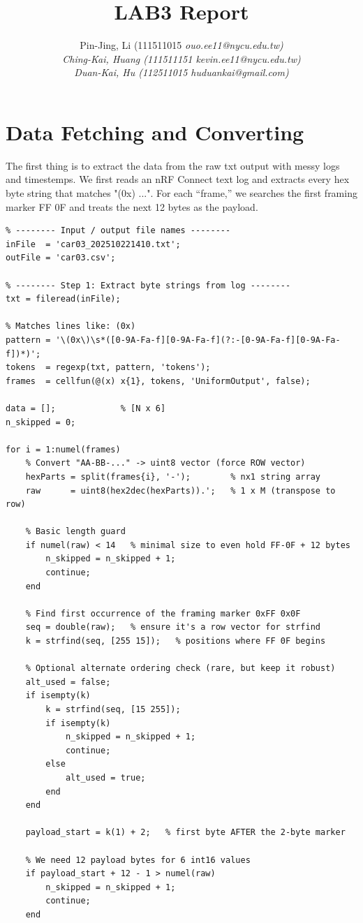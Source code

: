 \documentclass[10pt]{article}
\title{\vspace{-0.2em} \huge LAB3 Report}
\author{Pin-Jing, Li (111511015 \it{ouo.ee11@nycu.edu.tw})\\ 
Ching-Kai, Huang (111511151 \it{kevin.ee11@nycu.edu.tw})\\ 
Duan-Kai, Hu (112511015 \it{huduankai@gmail.com})}
\begin{document}
\maketitle

\section{Data Fetching and Converting}

The first thing is to extract the data from the raw txt output with messy logs and timestemps.
We first reads an nRF Connect text log and extracts every hex byte string that matches "(0x) ...". 
For each “frame,” we searches the first framing marker FF 0F and treats the next 12 bytes as the payload.

\begin{lstlisting}
% -------- Input / output file names --------
inFile  = 'car03_202510221410.txt';  
outFile = 'car03.csv'; 

% -------- Step 1: Extract byte strings from log --------
txt = fileread(inFile);

% Matches lines like: (0x) 
pattern = '\(0x\)\s*([0-9A-Fa-f][0-9A-Fa-f](?:-[0-9A-Fa-f][0-9A-Fa-f])*)';
tokens  = regexp(txt, pattern, 'tokens');
frames  = cellfun(@(x) x{1}, tokens, 'UniformOutput', false);

data = [];             % [N x 6]
n_skipped = 0;

for i = 1:numel(frames)
    % Convert "AA-BB-..." -> uint8 vector (force ROW vector)
    hexParts = split(frames{i}, '-');        % nx1 string array
    raw      = uint8(hex2dec(hexParts)).';   % 1 x M (transpose to row)

    % Basic length guard
    if numel(raw) < 14   % minimal size to even hold FF-0F + 12 bytes
        n_skipped = n_skipped + 1;
        continue;
    end

    % Find first occurrence of the framing marker 0xFF 0x0F
    seq = double(raw);   % ensure it's a row vector for strfind
    k = strfind(seq, [255 15]);   % positions where FF 0F begins

    % Optional alternate ordering check (rare, but keep it robust)
    alt_used = false;
    if isempty(k)
        k = strfind(seq, [15 255]);
        if isempty(k)
            n_skipped = n_skipped + 1;
            continue;
        else
            alt_used = true;
        end
    end

    payload_start = k(1) + 2;   % first byte AFTER the 2-byte marker

    % We need 12 payload bytes for 6 int16 values
    if payload_start + 12 - 1 > numel(raw)
        n_skipped = n_skipped + 1;
        continue;
    end


\end{lstlisting}
\end{document}
